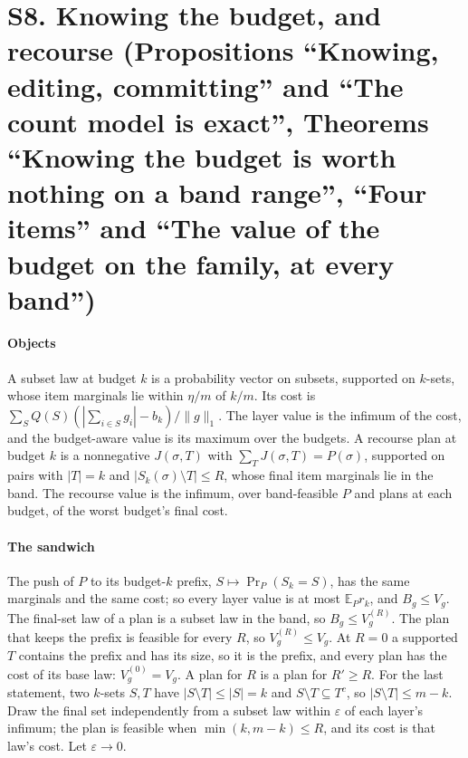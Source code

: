 \section{S8. Knowing the budget, and recourse (Propositions ``Knowing, editing, committing'' and
``The count model is exact'', Theorems ``Knowing the budget is worth nothing on a band range'',
``Four items'' and ``The value of the budget on the family, at every band'')}

\paragraph{Objects} A subset law at budget $k$ is a probability vector on subsets, supported on
$k$-sets, whose item marginals lie within $\eta/m$ of $k/m$. Its cost is
$\sum_SQ(S)(|\sum_{i\in S}g_i|-b_k)/\|g\|_1$. The layer value is the infimum of the cost, and the
budget-aware value is its maximum over the budgets. A recourse plan at budget $k$ is a
nonnegative $J(\sigma,T)$ with $\sum_TJ(\sigma,T)=P(\sigma)$, supported on pairs with $|T|=k$ and
$|S_k(\sigma)\setminus T|\le R$, whose final item marginals lie in the band. The recourse value
is the infimum, over band-feasible $P$ and plans at each budget, of the worst budget's final cost.

\paragraph{The sandwich} The push of $P$ to its budget-$k$ prefix, $S\mapsto\Pr_P(S_k=S)$, has the
same marginals and the same cost; so every layer value is at most $\mathbb E_Pr_k$, and
$B_g\le V_g$. The final-set law of a plan is a subset law in the band, so $B_g\le V^{(R)}_g$. The
plan that keeps the prefix is feasible for every $R$, so $V^{(R)}_g\le V_g$. At $R=0$ a
supported $T$ contains the prefix and has its size, so it is the prefix, and every plan has the
cost of its base law: $V^{(0)}_g=V_g$. A plan for $R$ is a plan for $R'\ge R$. For the last
statement, two $k$-sets $S,T$ have $|S\setminus T|\le|S|=k$ and $S\setminus T\subseteq T^{c}$,
so $|S\setminus T|\le m-k$. Draw the final set independently from a subset law within
$\varepsilon$ of each layer's infimum; the plan is feasible when $\min(k,m-k)\le R$, and its
cost is that law's cost. Let $\varepsilon\to0$.


